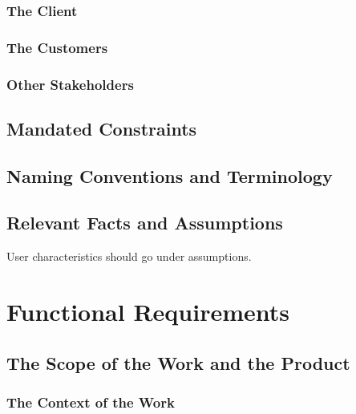 \documentclass[12pt]{article}
\begin{document}
\subsubsection{The Client}

\subsubsection{The Customers}

\subsubsection{Other Stakeholders}

\subsection{Mandated Constraints}

\subsection{Naming Conventions and Terminology}

\subsection{Relevant Facts and Assumptions}

User characteristics should go under assumptions.

\section{Functional Requirements}

\subsection{The Scope of the Work and the Product}

\subsubsection{The Context of the Work}
\end{document}
